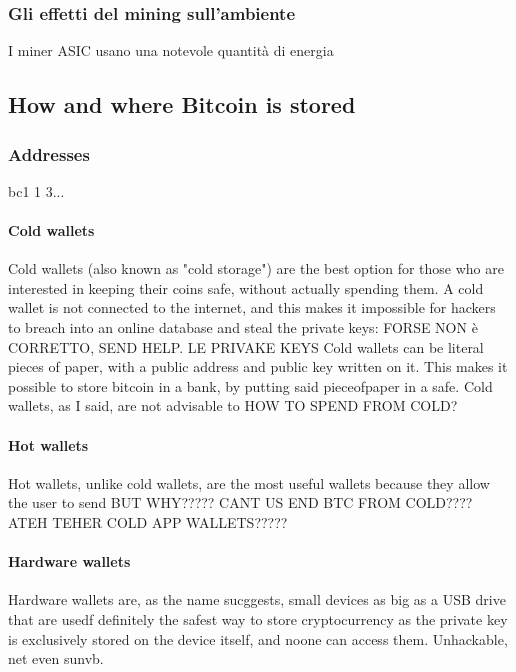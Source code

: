 \documentclass {article}
\begin{document}
\subsubsection {Gli effetti del mining sull'ambiente}


I miner ASIC usano una notevole quantità di energia


\subsection {How and where Bitcoin is stored}


\subsubsection {Addresses}


bc1 1 3...


\paragraph {Cold wallets}


Cold wallets (also known as "cold storage") are the best option for those who are interested in keeping their coins safe, without actually spending them. A cold wallet is not connected to the internet, and this makes it impossible for hackers to breach into an online database and steal the private keys: FORSE NON è CORRETTO, SEND HELP. LE PRIVAKE KEYS 
Cold wallets can be literal pieces of paper, with a public address and public key written on it. This makes it possible to store bitcoin in a bank, by putting said pieceofpaper in a safe.
Cold wallets, as I said, are not advisable to HOW TO SPEND FROM COLD?


\paragraph {Hot wallets}


Hot wallets, unlike cold wallets, are the most useful wallets because they allow the user to send BUT WHY????? CANT US END BTC FROM COLD???? ATEH TEHER COLD APP WALLETS?????


\paragraph {Hardware wallets}


Hardware wallets are, as the name sucggests, small devices as big as a USB drive that are usedf
definitely the safest way to store cryptocurrency as the private key is exclusively stored on the device itself, and noone can access them. Unhackable, net even sunvb.
\end{document}
